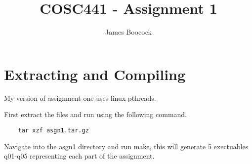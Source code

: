 \documentclass[12pt]{article}
\begin{document}
 
 
\title{COSC441 - Assignment 1}
\author{James Boocock}
\maketitle
\section{Extracting and Compiling}
My version of assignment one uses linux pthreads.

First extract the files and run using the following command.

\begin{verbatim}
    tar xzf asgn1.tar.gz
\end{verbatim}
Navigate into the asgn1 directory and run make, this will generate 5 exectuables q01-q05 representing each part of the assignment.
\end{document}
